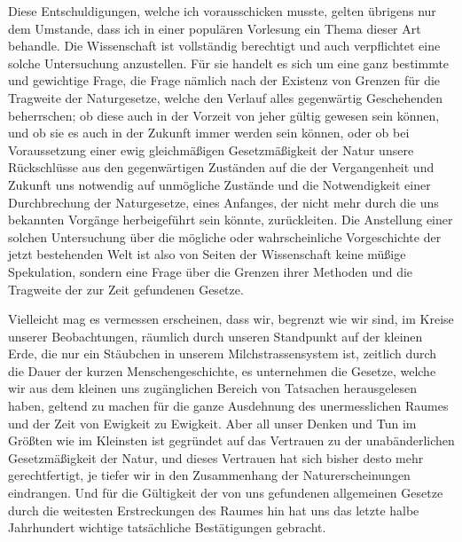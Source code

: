 \documentclass[a4paper, 11pt, oneside, german]{article}
\begin{document}
Diese Entschuldigungen, welche ich vorausschicken musste, gelten übrigens nur dem Umstande, dass ich in einer populären Vorlesung ein Thema dieser Art behandle. Die Wissenschaft ist vollständig berechtigt und auch verpflichtet eine solche Untersuchung anzustellen. Für sie handelt es sich um eine ganz bestimmte und gewichtige Frage, die Frage nämlich nach der Existenz von Grenzen für die Tragweite der Naturgesetze, welche den Verlauf alles gegenwärtig Geschehenden beherrschen; ob diese auch in der Vorzeit von jeher gültig gewesen sein können, und ob sie es auch in der Zukunft immer werden sein können, oder ob bei Voraussetzung einer ewig gleichmäßigen Gesetzmäßigkeit der Natur unsere Rückschlüsse aus den gegenwärtigen Zuständen auf die der Vergangenheit und Zukunft uns notwendig auf unmögliche Zustände und die Notwendigkeit einer Durchbrechung der Naturgesetze, eines Anfanges, der nicht mehr durch die uns bekannten Vorgänge herbeigeführt sein könnte, zurückleiten. Die Anstellung einer solchen Untersuchung über die mögliche oder wahrscheinliche Vorgeschichte der jetzt bestehenden Welt ist also von Seiten der Wissenschaft keine müßige Spekulation, sondern eine Frage über die Grenzen ihrer Methoden und die Tragweite der zur Zeit gefundenen Gesetze.

Vielleicht mag es vermessen erscheinen, dass wir, begrenzt wie wir sind, im Kreise unserer Beobachtungen, räumlich durch unseren Standpunkt auf der kleinen Erde, die nur ein Stäubchen in unserem Milchstrassensystem ist, zeitlich durch die Dauer der kurzen Menschengeschichte, es unternehmen die Gesetze, welche wir aus dem kleinen uns zugänglichen Bereich von Tatsachen herausgelesen haben, geltend zu machen für die ganze Ausdehnung des unermesslichen Raumes und der Zeit von Ewigkeit zu Ewigkeit. Aber all unser Denken und Tun im Größten wie im Kleinsten ist gegründet auf das Vertrauen zu der unabänderlichen Gesetzmäßigkeit der Natur, und dieses Vertrauen hat sich bisher desto mehr gerechtfertigt, je tiefer wir in den Zusammenhang der Naturerscheinungen eindrangen. Und für die Gültigkeit der von uns gefundenen allgemeinen Gesetze durch die weitesten Erstreckungen des Raumes hin hat uns das letzte halbe Jahrhundert wichtige tatsächliche Bestätigungen gebracht.
\end{document}
